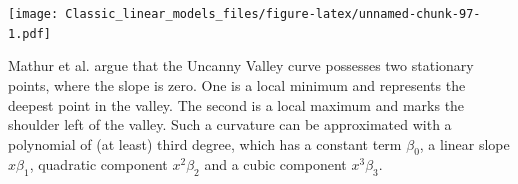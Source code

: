 \documentclass[]{svmono}
\newenvironment{Shaded}{\begin{snugshade}}{\end{snugshade}}
\newcommand{\KeywordTok}[1]{\textcolor[rgb]{0.13,0.29,0.53}{\textbf{#1}}}
\newcommand{\DataTypeTok}[1]{\textcolor[rgb]{0.13,0.29,0.53}{#1}}
\newcommand{\DecValTok}[1]{\textcolor[rgb]{0.00,0.00,0.81}{#1}}
\newcommand{\FloatTok}[1]{\textcolor[rgb]{0.00,0.00,0.81}{#1}}
\newcommand{\StringTok}[1]{\textcolor[rgb]{0.31,0.60,0.02}{#1}}
\newcommand{\OperatorTok}[1]{\textcolor[rgb]{0.81,0.36,0.00}{\textbf{#1}}}
\newcommand{\NormalTok}[1]{#1}
\theoremstyle{definition}
\theoremstyle{definition}
\theoremstyle{definition}
\theoremstyle{remark}
\begin{document}
\begin{Shaded}
\end{Shaded}

\texttt{[image: Classic\_linear\_models\_files/figure-latex/unnamed-chunk-97-1.pdf]}

Mathur et al. argue that the Uncanny Valley curve possesses two
stationary points, where the slope is zero. One is a local minimum and
represents the deepest point in the valley. The second is a local
maximum and marks the shoulder left of the valley. Such a curvature can
be approximated with a polynomial of (at least) third degree, which has
a constant term \(\beta_0\), a linear slope \(x\beta_1\), quadratic
component \(x^2\beta_2\) and a cubic component \(x^3\beta_3\).
\end{document}
